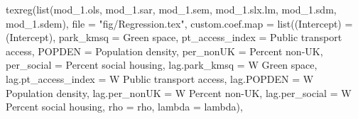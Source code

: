 \documentclass[
  letterpaper,
  DIV=11,
  numbers=noendperiod]{scrreprt}
\newenvironment{Shaded}{\begin{snugshade}}{\end{snugshade}}
\newcommand{\AttributeTok}[1]{\textcolor[rgb]{0.40,0.45,0.13}{#1}}
\newcommand{\FunctionTok}[1]{\textcolor[rgb]{0.28,0.35,0.67}{#1}}
\newcommand{\NormalTok}[1]{\textcolor[rgb]{0.00,0.23,0.31}{#1}}
\newcommand{\OtherTok}[1]{\textcolor[rgb]{0.00,0.23,0.31}{#1}}
\newcommand{\StringTok}[1]{\textcolor[rgb]{0.13,0.47,0.30}{#1}}
\begin{document}
\begin{Shaded}
\begin{Highlighting}[]
\FunctionTok{texreg}\NormalTok{(}\FunctionTok{list}\NormalTok{(mod\_1.ols, mod\_1.sar, mod\_1.sem, mod\_1.slx.lm, mod\_1.sdm, mod\_1.sdem),}
        \AttributeTok{file =} \StringTok{"fig/Regression.tex"}\NormalTok{,}
          \AttributeTok{custom.coef.map =} \FunctionTok{list}\NormalTok{(}\StringTok{\textquotesingle{}(Intercept)\textquotesingle{}} \OtherTok{=}  \StringTok{\textquotesingle{}(Intercept)\textquotesingle{}}\NormalTok{,}
                                 \StringTok{\textquotesingle{}park\_kmsq\textquotesingle{}} \OtherTok{=}  \StringTok{\textquotesingle{}Green space\textquotesingle{}}\NormalTok{,}
                                 \StringTok{\textquotesingle{}pt\_access\_index\textquotesingle{}} \OtherTok{=}  \StringTok{\textquotesingle{}Public transport access\textquotesingle{}}\NormalTok{,}
                                 \StringTok{\textquotesingle{}POPDEN\textquotesingle{}} \OtherTok{=}  \StringTok{\textquotesingle{}Population density\textquotesingle{}}\NormalTok{,}
                                 \StringTok{\textquotesingle{}per\_nonUK\textquotesingle{}} \OtherTok{=}  \StringTok{\textquotesingle{}Percent non{-}UK\textquotesingle{}}\NormalTok{,}
                                 \StringTok{\textquotesingle{}per\_social\textquotesingle{}} \OtherTok{=} \StringTok{\textquotesingle{}Percent social housing\textquotesingle{}}\NormalTok{,}
                                 \StringTok{\textquotesingle{}lag.park\_kmsq\textquotesingle{}} \OtherTok{=}  \StringTok{\textquotesingle{}W Green space\textquotesingle{}}\NormalTok{,}
                                 \StringTok{\textquotesingle{}lag.pt\_access\_index\textquotesingle{}} \OtherTok{=}  \StringTok{\textquotesingle{}W Public transport access\textquotesingle{}}\NormalTok{,}
                                 \StringTok{\textquotesingle{}lag.POPDEN\textquotesingle{}} \OtherTok{=}  \StringTok{\textquotesingle{}W Population density\textquotesingle{}}\NormalTok{,}
                                 \StringTok{\textquotesingle{}lag.per\_nonUK\textquotesingle{}} \OtherTok{=}  \StringTok{\textquotesingle{}W Percent non{-}UK\textquotesingle{}}\NormalTok{,}
                                 \StringTok{\textquotesingle{}lag.per\_social\textquotesingle{}} \OtherTok{=} \StringTok{\textquotesingle{}W Percent social housing\textquotesingle{}}\NormalTok{,}
                                 \StringTok{\textquotesingle{}rho\textquotesingle{}} \OtherTok{=} \StringTok{\textquotesingle{}rho\textquotesingle{}}\NormalTok{,}
                                 \StringTok{\textquotesingle{}lambda\textquotesingle{}} \OtherTok{=} \StringTok{\textquotesingle{}lambda\textquotesingle{}}\NormalTok{),}

\end{Highlighting}
\end{Shaded}
\end{document}
